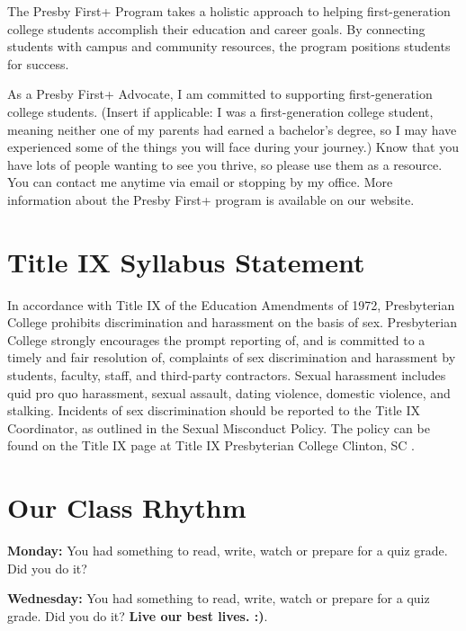 \documentclass[
]{book}
\begin{document}
The Presby First+ Program takes a holistic approach to helping first-generation college students accomplish their education and career goals. By connecting students with campus and community resources, the program positions students for success.

As a Presby First+ Advocate, I am committed to supporting first-generation college students. (Insert if applicable: I was a first-generation college student, meaning neither one of my parents had earned a bachelor's degree, so I may have experienced some of the things you will face during your journey.) Know that you have lots of people wanting to see you thrive, so please use them as a resource. You can contact me anytime via email or stopping by my office. More information about the Presby First+ program is available on our website.

\hypertarget{title-ix-syllabus-statement}{%
\section*{Title IX Syllabus Statement}\label{title-ix-syllabus-statement}}

In accordance with Title IX of the Education Amendments of 1972, Presbyterian College prohibits discrimination and harassment on the basis of sex. Presbyterian College strongly encourages the prompt reporting of, and is committed to a timely and fair resolution of, complaints of sex discrimination and harassment by students, faculty, staff, and third-party contractors. Sexual harassment includes quid pro quo harassment, sexual assault, dating violence, domestic violence, and stalking. Incidents of sex discrimination should be reported to the Title IX Coordinator, as outlined in the Sexual Misconduct Policy. The policy can be found on the Title IX page at Title IX \textbar{} Presbyterian College \textbar{} Clinton, SC .

\hypertarget{our-class-rhythm}{%
\section*{Our Class Rhythm}\label{our-class-rhythm}}

\textbf{Monday:} You had something to read, write, watch or prepare for a quiz grade. Did you do it?

\textbf{Wednesday:} You had something to read, write, watch or prepare for a quiz grade. Did you do it? \textbf{Live our best lives. :)}.
\end{document}
